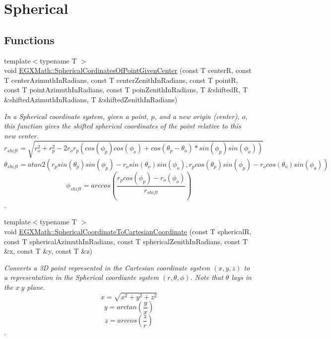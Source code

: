 \hypertarget{group___e_g_x_math-_conversions-_coordinate_conversions-3_d-_spherical}{}\section{Spherical}
\label{group___e_g_x_math-_conversions-_coordinate_conversions-3_d-_spherical}
\subsection*{Functions}
\begin{DoxyCompactItemize}
\item 
{\footnotesize template$<$typename T $>$ }\\void \mbox{\hyperlink{group___e_g_x_math-_conversions-_coordinate_conversions-3_d-_spherical_gaa9b50c4837e1cbea569de6f7bc90a3b6}{E\+G\+X\+Math\+::\+Spherical\+Cordinates\+Of\+Point\+Given\+Center}} (const T centerR, const T center\+Azimuth\+In\+Radians, const T center\+Zenith\+In\+Radians, const T pointR, const T point\+Azimuth\+In\+Radians, const T poin\+Zenith\+In\+Radians, T \&shiftedR, T \&shifted\+Azimuth\+In\+Radians, T \&shifted\+Zenith\+In\+Radians)
\begin{DoxyCompactList}\small\item\em In a Spherical coordinate system, given a point, $p$, and a new origin (center), $o$, this function gives the shifted spherical coordinates of the point relative to this new center. \[ r_{shift} = \sqrt{r_o^2+r_p^2 - 2 r_o r_p ( cos(\phi_p) cos(\phi_o) + cos(\theta_p-\theta_o) * sin(\phi_p) sin(\phi_o))}\] \[ \theta_{shift} = atan2( r_p sin(\theta_p) sin(\phi_p) - r_o sin(\theta_o) sin(\phi_o) , r_p cos(\theta_p) sin(\phi_p) - r_o cos(\theta_o) sin(\phi_o) )\] \[ \phi_{shift} = arccos(\frac{r_p cos(\phi_p) - r_o (\phi_o)}{r_{shift}}) \]. \end{DoxyCompactList}\item 
{\footnotesize template$<$typename T $>$ }\\void \mbox{\hyperlink{group___e_g_x_math-_conversions-_coordinate_conversions-3_d-_spherical_ga6a11867b77c662565471eabac9b4d114}{E\+G\+X\+Math\+::\+Spherical\+Coordinate\+To\+Cartesian\+Coordinate}} (const T sphericalR, const T spherical\+Azimuth\+In\+Radians, const T spherical\+Zenith\+In\+Radians, const T \&x, const T \&y, const T \&z)
\begin{DoxyCompactList}\small\item\em Converts a 3D point represented in the Cartesian coordinate system $(x,y,z)$ to a representation in the Spherical coordiante system $(r,\theta,\phi)$. Note that $\theta$ lays in the $x\ y$ plane. \[ x = \sqrt{x^2+y^2+z^2} \] \[ y = arctan(\frac{y}{x}) \] \[ z = arccos(\frac{z}{r}) \]. \end{DoxyCompactList}\item 

\end{DoxyCompactItemize}
